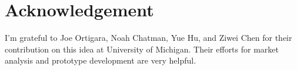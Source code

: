 \documentclass{article}
\begin{document}
\section{Acknowledgement}
I'm grateful to Joe Ortigara, Noah Chatman, Yue Hu, and Ziwei Chen for their contribution on this idea at  University of Michigan. Their efforts for market analysis and prototype development are very helpful.


\end{document}
